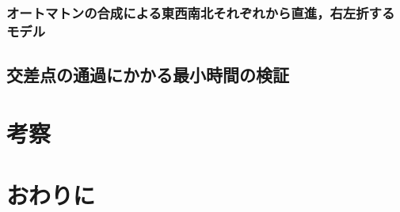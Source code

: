 \documentclass{tpu-sotu}
\begin{document}
	\subsection{オートマトンの合成による東西南北それぞれから直進，右左折するモデル}
	\section{交差点の通過にかかる最小時間の検証}
\chapter{考察}

\chapter{おわりに}
\acknowledgements

\begin{thebibliography}{1}
\end{thebibliography}
\end{document}
